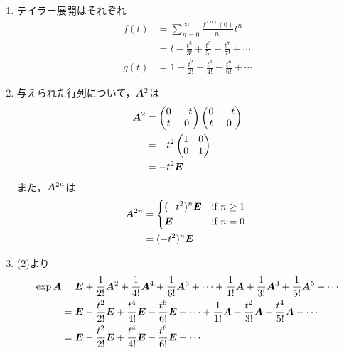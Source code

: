 \begin{ans*}
  ${}$
  \begin{enumerate}[label=(\arabic*)]
    \item テイラー展開はそれぞれ
    \begin{align}
      f(t) 
      &= \sum_{n=0}^{\infty} \frac{f^{(n)}(0)}{n!} t^n \\
      &= t - \frac{t^3}{3!} + \frac{t^5}{5!} - \frac{t^7}{7!} + \cdots \\
      g(t)
      &= 1 - \frac{t^2}{2!} + \frac{t^4}{4!} - \frac{t^6}{6!} + \cdots
    \end{align}
    \item 与えられた行列について，$\bm{A}^2$は
    \begin{align}
      \bm{A}^2
      &=
      \begin{pmatrix}
        0 & -t \\
        t & 0 
      \end{pmatrix}
      \begin{pmatrix}
        0 & -t \\
        t & 0
      \end{pmatrix} \\
      &= -t^2
      \begin{pmatrix}
        1 & 0 \\
        0 & 1
      \end{pmatrix} \\
      &= -t^2 \bm{E}
    \end{align}
    また，$\bm{A}^{2n}$は
    \begin{align}
      \bA^{2n}
      &=
      \begin{dcases*}
        (-t^{2})^{n}\bE & if $n\geq 1$ \\
        \bE & if $n = 0$
      \end{dcases*} \\
      &= (-t^{2})^{n}\bE    
    \end{align}
    \item (2)より
    \begin{align}
      \exp\bA
      &= 
      \bE + \frac{1}{2!}\bA^2 + \frac{1}{4!}\bA^4 + \frac{1}{6!}\bA^6 + \cdots 
      + \frac{1}{1!}\bA + \frac{1}{3!}\bA^3 + \frac{1}{5!}\bA^5 + \cdots \\
      &= 
      \bE - \frac{t^2}{2!}\bE + \frac{t^4}{4!}\bE - \frac{t^6}{6!}\bE + \cdots 
      + \frac{1}{1!}\bA - \frac{t^2}{3!}\bA + \frac{t^4}{5!}\bA - \cdots \\
      &=
      \bE - \frac{t^2}{2!}\bE + \frac{t^4}{4!}\bE - \frac{t^6}{6!}\bE + \cdots 

\end{align}
\end{enumerate}
\end{ans*}
